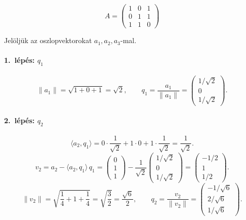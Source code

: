 \documentclass[a4paper,12pt]{article}
\begin{document}
\[
A = \begin{pmatrix} 1 & 0 & 1 \\ 0 & 1 & 1 \\ 1 & 1 & 0 \end{pmatrix}
\]

Jelöljük az oszlopvektorokat $a_1, a_2, a_3$-mal.

\paragraph{1.\ lépés: $q_1$}
\[
\lVert a_1 \rVert = \sqrt{1+0+1} = \sqrt{2}, \qquad
q_1 = \frac{a_1}{\lVert a_1 \rVert} = \begin{pmatrix} 1/\sqrt{2} \\ 0 \\ 1/\sqrt{2} \end{pmatrix}.
\]

\paragraph{2.\ lépés: $q_2$}
\[
\langle a_2, q_1 \rangle = 0\cdot\frac{1}{\sqrt{2}} + 1\cdot 0 + 1\cdot\frac{1}{\sqrt{2}} = \frac{1}{\sqrt{2}}.
\]
\[
v_2 = a_2 - \langle a_2, q_1 \rangle\, q_1
= \begin{pmatrix} 0\\1\\1 \end{pmatrix} - \frac{1}{\sqrt{2}}\begin{pmatrix} 1/\sqrt{2}\\0\\1/\sqrt{2} \end{pmatrix}
= \begin{pmatrix} -1/2\\1\\1/2 \end{pmatrix}.
\]
\[
\lVert v_2 \rVert = \sqrt{\frac{1}{4}+1+\frac{1}{4}} = \sqrt{\frac{3}{2}} = \frac{\sqrt{6}}{2}, \qquad
q_2 = \frac{v_2}{\lVert v_2 \rVert} = \begin{pmatrix} -1/\sqrt{6} \\ 2/\sqrt{6} \\ 1/\sqrt{6} \end{pmatrix}.
\]
\end{document}
